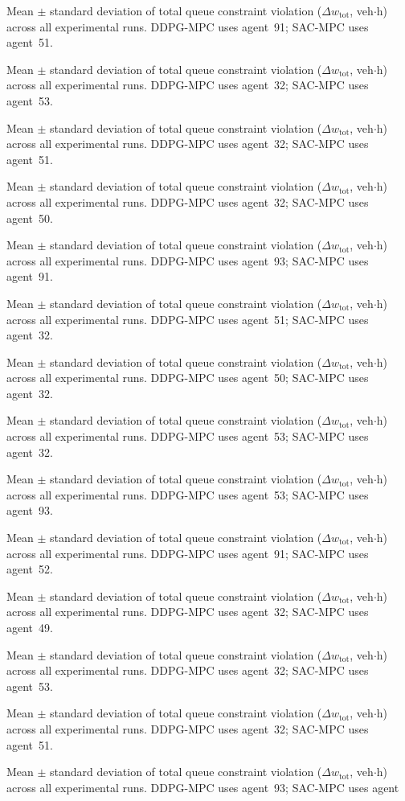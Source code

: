 \begin{table}[htbp]
\centering
\caption{Mean $\pm$ standard deviation of total queue constraint violation ($\Delta w_{\mathrm{tot}}$, veh$\cdot$h) across all experimental runs. DDPG-MPC uses agent~91; SAC-MPC uses agent~51.}
\caption{Mean $\pm$ standard deviation of total queue constraint violation ($\Delta w_{\mathrm{tot}}$, veh$\cdot$h) across all experimental runs. DDPG-MPC uses agent~32; SAC-MPC uses agent~53.}
\caption{Mean $\pm$ standard deviation of total queue constraint violation ($\Delta w_{\mathrm{tot}}$, veh$\cdot$h) across all experimental runs. DDPG-MPC uses agent~32; SAC-MPC uses agent~51.}
\caption{Mean $\pm$ standard deviation of total queue constraint violation ($\Delta w_{\mathrm{tot}}$, veh$\cdot$h) across all experimental runs. DDPG-MPC uses agent~32; SAC-MPC uses agent~50.}
\caption{Mean $\pm$ standard deviation of total queue constraint violation ($\Delta w_{\mathrm{tot}}$, veh$\cdot$h) across all experimental runs. DDPG-MPC uses agent~93; SAC-MPC uses agent~91.}
\caption{Mean $\pm$ standard deviation of total queue constraint violation ($\Delta w_{\mathrm{tot}}$, veh$\cdot$h) across all experimental runs. DDPG-MPC uses agent~51; SAC-MPC uses agent~32.}
\caption{Mean $\pm$ standard deviation of total queue constraint violation ($\Delta w_{\mathrm{tot}}$, veh$\cdot$h) across all experimental runs. DDPG-MPC uses agent~50; SAC-MPC uses agent~32.}
\caption{Mean $\pm$ standard deviation of total queue constraint violation ($\Delta w_{\mathrm{tot}}$, veh$\cdot$h) across all experimental runs. DDPG-MPC uses agent~53; SAC-MPC uses agent~32.}
\caption{Mean $\pm$ standard deviation of total queue constraint violation ($\Delta w_{\mathrm{tot}}$, veh$\cdot$h) across all experimental runs. DDPG-MPC uses agent~53; SAC-MPC uses agent~93.}
\caption{Mean $\pm$ standard deviation of total queue constraint violation ($\Delta w_{\mathrm{tot}}$, veh$\cdot$h) across all experimental runs. DDPG-MPC uses agent~91; SAC-MPC uses agent~52.}
\caption{Mean $\pm$ standard deviation of total queue constraint violation ($\Delta w_{\mathrm{tot}}$, veh$\cdot$h) across all experimental runs. DDPG-MPC uses agent~32; SAC-MPC uses agent~49.}
\caption{Mean $\pm$ standard deviation of total queue constraint violation ($\Delta w_{\mathrm{tot}}$, veh$\cdot$h) across all experimental runs. DDPG-MPC uses agent~32; SAC-MPC uses agent~53.}
\caption{Mean $\pm$ standard deviation of total queue constraint violation ($\Delta w_{\mathrm{tot}}$, veh$\cdot$h) across all experimental runs. DDPG-MPC uses agent~32; SAC-MPC uses agent~51.}
\caption{Mean $\pm$ standard deviation of total queue constraint violation ($\Delta w_{\mathrm{tot}}$, veh$\cdot$h) across all experimental runs. DDPG-MPC uses agent~93; SAC-MPC uses agent~\label{tab:dw_tot_comparison_agent}
}
\end{table}
